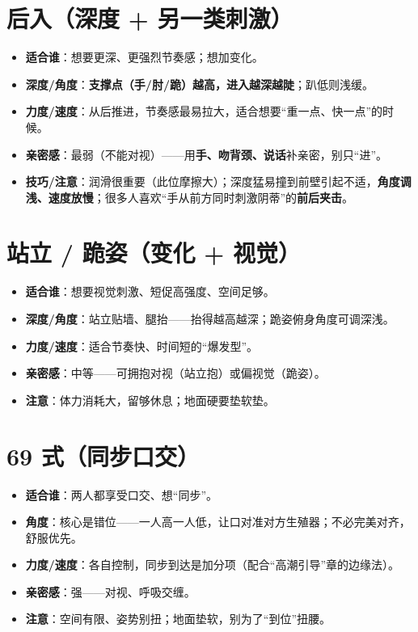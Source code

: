 \section{后入（深度 + 另一类刺激）}
\begin{itemize}[leftmargin=2em,itemsep=0.3em]
  \item \textbf{适合谁}：想要更深、更强烈节奏感；想加变化。
  \item \textbf{深度/角度}：\textbf{支撑点（手/肘/跪）越高，进入越深越陡}；趴低则浅缓。
  \item \textbf{力度/速度}：从后推进，节奏感最易拉大，适合想要“重一点、快一点”的时候。
  \item \textbf{亲密感}：最弱（不能对视）——用\textbf{手、吻背颈、说话}补亲密，别只“进”。
  \item \textbf{技巧/注意}：润滑很重要（此位摩擦大）；深度猛易撞到前壁引起不适，\textbf{角度调浅、速度放慢}；很多人喜欢“手从前方同时刺激阴蒂”的\textbf{前后夹击}。
\end{itemize}

\section{站立 / 跪姿（变化 + 视觉）}
\begin{itemize}[leftmargin=2em,itemsep=0.3em]
  \item \textbf{适合谁}：想要视觉刺激、短促高强度、空间足够。
  \item \textbf{深度/角度}：站立贴墙、腿抬——抬得越高越深；跪姿俯身角度可调深浅。
  \item \textbf{力度/速度}：适合节奏快、时间短的“爆发型”。
  \item \textbf{亲密感}：中等——可拥抱对视（站立抱）或偏视觉（跪姿）。
  \item \textbf{注意}：体力消耗大，留够休息；地面硬要垫软垫。
\end{itemize}

\section{69 式（同步口交）}
\begin{itemize}[leftmargin=2em,itemsep=0.3em]
  \item \textbf{适合谁}：两人都享受口交、想“同步”。
  \item \textbf{角度}：核心是错位——一人高一人低，让口对准对方生殖器；不必完美对齐，舒服优先。
  \item \textbf{力度/速度}：各自控制，同步到达是加分项（配合“高潮引导”章的边缘法）。
  \item \textbf{亲密感}：强——对视、呼吸交缠。
  \item \textbf{注意}：空间有限、姿势别扭；地面垫软，别为了“到位”扭腰。
\end{itemize}

